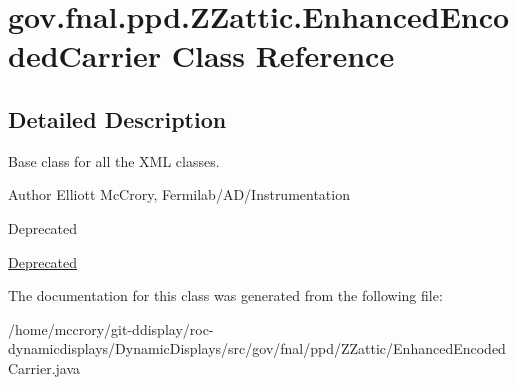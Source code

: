 \hypertarget{classgov_1_1fnal_1_1ppd_1_1ZZattic_1_1EnhancedEncodedCarrier}{\section{gov.\-fnal.\-ppd.\-Z\-Zattic.\-Enhanced\-Encoded\-Carrier Class Reference}
\label{classgov_1_1fnal_1_1ppd_1_1ZZattic_1_1EnhancedEncodedCarrier}
}


\subsection{Detailed Description}
Base class for all the X\-M\-L classes.

\begin{DoxyAuthor}{Author}
Elliott Mc\-Crory, Fermilab/\-A\-D/\-Instrumentation 
\end{DoxyAuthor}
\begin{DoxyRefDesc}{Deprecated}
\item[\hyperlink{deprecated__deprecated000012}{Deprecated}]\end{DoxyRefDesc}


The documentation for this class was generated from the following file\-:\begin{DoxyCompactItemize}
\item 
/home/mccrory/git-\/ddisplay/roc-\/dynamicdisplays/\-Dynamic\-Displays/src/gov/fnal/ppd/\-Z\-Zattic/Enhanced\-Encoded\-Carrier.\-java\end{DoxyCompactItemize}

